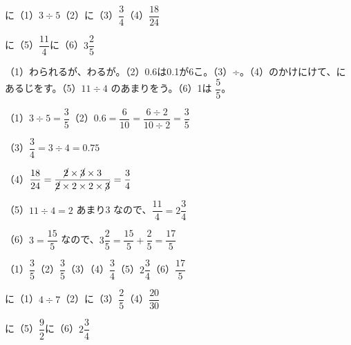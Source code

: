\begin{reidai}[\R{分数}{ぶん|すう}と\R{小数}{しょう|すう}、\R{約分}{やく|ぶん}]
に（1）\nobreak $3\div5$\enspace（2）\quad {}に（3）\nobreak $\dfrac{3}{4}$\quad {}（4）\nobreak $\dfrac{18}{24}$\par
{}に（5）\nobreak $\dfrac{11}{4}$\quad {}に（6）\nobreak $3\dfrac{2}{5}$\par
\kangaekata （1）わられるが、わるが。（2）0.6は0.1が6こ。（3）÷。（4）のかけにけて、にあるじをす。（5）$11\div4$ のあまりをう。（6）1は $\dfrac{5}{5}$。\par
\shiki （1）\nobreak $3\div5=\dfrac{3}{5}$\quad（2）\nobreak $0.6=\dfrac{6}{10}=\dfrac{6\div2}{10\div2}=\dfrac{3}{5}$\par
\hspace*{2.6\zw}（3）\nobreak $\dfrac{3}{4}=3\div4=0.75$\rule{0pt}{5.4ex}\par
\hspace*{2.6\zw}（4）\nobreak $\dfrac{18}{24}=\dfrac{\cancel{2}\times\cancel{3}\times3}{\cancel{2}\times2\times2\times\cancel{3}}=\dfrac{3}{4}$\par
\hspace*{2.6\zw}（5）\nobreak $11\div4=2$ あまり3 なので、$\dfrac{11}{4}=2\dfrac{3}{4}$\par
\hspace*{2.6\zw}（6）\nobreak $3=\dfrac{15}{5}$ なので、$3\dfrac{2}{5}=\dfrac{15}{5}+\dfrac{2}{5}=\dfrac{17}{5}$\par
\kotae （1）\nobreak $\dfrac{3}{5}$\quad（2）\nobreak $\dfrac{3}{5}$\quad（3）\quad（4）\nobreak $\dfrac{3}{4}$\quad（5）\nobreak $2\dfrac{3}{4}$\quad（6）\nobreak $\dfrac{17}{5}$
\end{reidai}

\begin{jibun}
に（1）\nobreak $4\div7$\enspace（2）\quad {}に（3）\nobreak $\dfrac{2}{5}$\quad {}（4）\nobreak $\dfrac{20}{30}$\par
{}に（5）\nobreak $\dfrac{9}{2}$\quad {}に（6）\nobreak $2\dfrac{3}{4}$
\end{jibun}

